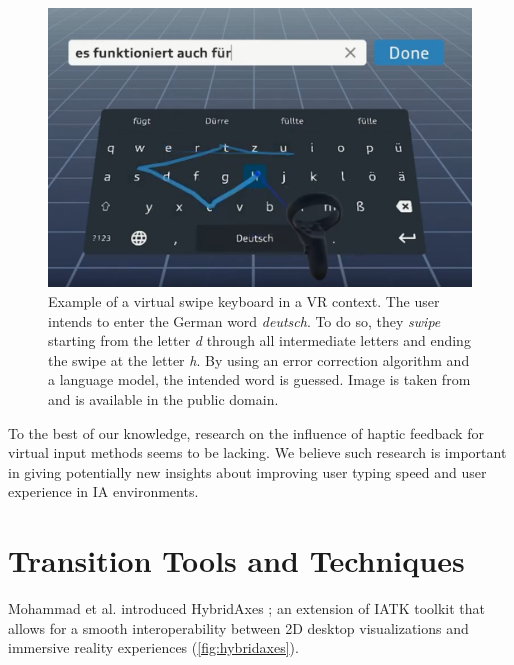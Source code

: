 \documentclass{vgtc}                          %
\begin{document}
\begin{figure}[tb]
	\centering
	\includegraphics[width=\columnwidth]{swipe_keyboard}
    \caption{Example of a virtual swipe keyboard in a VR context. The user intends to enter the German word
    \textit{deutsch}. To do so, they \textit{swipe} starting from the letter \textit{d} through all
    intermediate letters and ending the swipe at the letter \textit{h}. By using an error correction
    algorithm and a language model, the intended word is guessed. Image is taken
    from \cite{swipe_keyboard_yt} and is available in the public domain.}
    \label{fig:swipe_keyboard}
\end{figure}

\medskip

\noindent To the best of our knowledge, research on the influence of haptic feedback for virtual input
methods seems to be lacking. We believe such research is important in giving potentially new insights about
improving user typing speed and user experience in IA environments.

\section{Transition Tools and Techniques}
Mohammad et al. introduced HybridAxes \cite{hybridaxes_tool}; an extension of
IATK toolkit that allows for a smooth interoperability between 2D desktop
visualizations and immersive reality experiences (\autoref{fig:hybridaxes}).

\medskip
\end{document}
